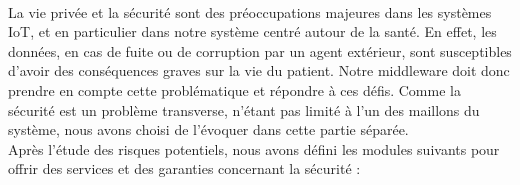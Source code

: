 \paragraph{}
La vie privée et la sécurité sont des préoccupations majeures dans les systèmes IoT, et en particulier dans notre système centré autour de la santé. En effet, les données, en cas de fuite ou de corruption par un agent extérieur, sont susceptibles d'avoir des conséquences graves sur la vie du patient. Notre middleware doit donc prendre en compte cette problématique et répondre à ces défis. Comme la sécurité est un problème transverse, n'étant pas limité à l'un des maillons du système, nous avons choisi de l'évoquer dans cette partie séparée. \\Après l'étude des risques potentiels, nous avons défini les modules suivants pour offrir des services et des garanties concernant la sécurité :\\
